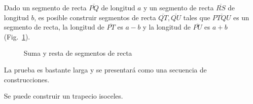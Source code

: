 \begin{theorem}\label{thm.add-subtract-mm}
Dado un segmento de recta $\overline{PQ}$ de longitud $a$ y un segmento de recta $\overline{RS}$ de longitud $b$, es posible construir segmentos de recta $\overline{QT}, \overline{QU}$ tales que $\overline{PTQU}$ es un segmento de recta, la longitud de $\overline{PT}$ es $a-b$ y la longitud de $\overline{PU}$ es $a+b$ (Fig.~\ref{f.compass-add1}).
\end{theorem}
\begin{figure}[ht]
\begin{center}
\end{center}
\caption{Suma y resta de segmentos de recta}\label{f.compass-add1}
\end{figure}

La prueba es bastante larga y se presentará como una secuencia de construcciones.

\begin{theorem}\label{thm.compass-trapezoid}
Se puede construir un trapecio isoceles.
\end{theorem}

